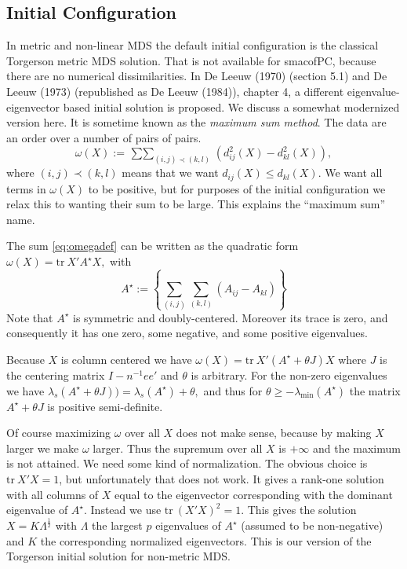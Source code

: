 \documentclass[
  12pt,
]{article}
\begin{document}
\subsection{Initial Configuration}\label{initial-configuration}

In metric and non-linear MDS the default initial configuration is the
classical Torgerson metric MDS solution. That is not available for
smacofPC, because there are no numerical dissimilarities. In
De Leeuw (1970) (section 5.1) and De Leeuw (1973) (republished as De Leeuw (1984)), chapter 4, a different eigenvalue-eigenvector based initial solution is proposed. We discuss a somewhat modernized version here. It is sometime known as the \emph{maximum sum method}.
The data are an order over a number of pairs of pairs.
\begin{equation}
\omega(X):=\mathop{\sum\sum}_{(i,j)\prec(k,l)}(d_{ij}^2(X)-d_{kl}^2(X)),
\label{eq:omegadef}
\end{equation}
where \((i,j)\prec(k,l)\) means that we want \(d_{ij}(X)\leq d_{kl}(X)\).
We want all terms in \(\omega(X)\) to be positive, but for purposes of
the initial configuration we relax this to wanting their sum to be
large. This explains the ``maximum sum'' name.

The sum \eqref{eq:omegadef} can be written as the quadratic form
\(\omega(X)=\text{tr}\ X'A^\star X,\)
with
\begin{equation}
A^\star:=\left\{\sum_{(i,j)}\sum_{(k,l)}(A_{ij}-A_{kl})\right\} 
\label{eq:astardef}
\end{equation}
Note that \(A^\star\) is symmetric and doubly-centered. Moreover
its trace is zero, and consequently it has one zero, some negative,
and some positive eigenvalues.

Because \(X\) is column centered we have
\(\omega(X)=\text{tr}\ X'(A^\star + \theta J)X\) where \(J\) is the
centering matrix \(I-n^{-1}ee'\) and \(\theta\) is arbitrary. For
the non-zero eigenvalues we have
\(\lambda_s(A^\star + \theta J))=\lambda_s(A^\star) + \theta,\)
and thus for \(\theta\geq-\lambda_{\text{min}}(A^\star)\) the matrix \(A^\star + \theta J\) is positive semi-definite.

Of course maximizing \(\omega\) over all \(X\) does not make sense, because
by making \(X\) larger we make \(\omega\) larger. Thus the supremum over all
\(X\) is \(+\infty\) and the maximum is not attained. We need some
kind of normalization. The obvious choice is \(\text{tr}\ X'X=1\), but
unfortunately that does not work. It gives a rank-one solution
with all columns of \(X\) equal to the eigenvector corresponding with the
dominant eigenvalue of \(A^\star\). Instead we use \(\text{tr}\ (X'X)^2=1\).
This gives the solution \(X=K\Lambda^\frac12\) with \(\Lambda\) the largest \(p\) eigenvalues of \(A^\star\) (assumed to be non-negative) and \(K\) the
corresponding normalized eigenvectors. This is our version of
the Torgerson initial solution for non-metric MDS.
\end{document}
